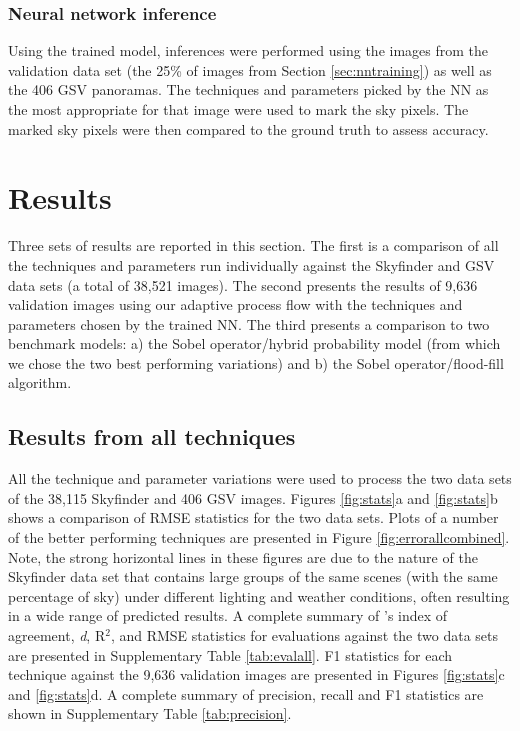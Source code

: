 \documentclass[final,3p,times,authoryear]{elsarticle}
\begin{document}
\subsubsection{Neural network inference}\label{sec:nninference}    
Using the trained model, inferences were performed using the images from the validation data set (the 25\% of images from Section \ref{sec:nntraining}) as well as the 406 GSV panoramas. The techniques and parameters picked by the NN as the most appropriate for that image were used to mark the sky pixels. The marked sky pixels were then compared to the ground truth to assess accuracy.



\section{Results}\label{sec:results}


Three sets of results are reported in this section. The first is a comparison of all the techniques and parameters run individually against the Skyfinder and GSV data sets (a total of 38,521 images). The second presents the results of 9,636 validation images using our adaptive process flow with the techniques and parameters chosen by the trained NN. The third presents a comparison to two benchmark models: a) the \cite{Wang2015a} Sobel operator/hybrid probability model (from which we chose the two best performing variations) and b) the \cite{Middel2018} Sobel operator/flood-fill algorithm.

\subsection{Results from all techniques}\label{sec:resultsall}
All the technique and parameter variations were used to process the two data sets of the 38,115 Skyfinder and 406 GSV images. Figures \ref{fig:stats}a and \ref{fig:stats}b shows a comparison of RMSE statistics for the two data sets. Plots of a number of the better performing techniques are presented in Figure \ref{fig:errorallcombined}. Note, the strong horizontal lines in these figures are due to the nature of the Skyfinder data set that contains large groups of the same scenes (with the same percentage of sky) under different lighting and weather conditions, often resulting in a wide range of predicted results. A complete summary of \cite{Willmott1981}'s index of agreement, \textit{d}, R$^{2}$, and RMSE statistics for evaluations against the two data sets are presented in Supplementary Table \ref{tab:evalall}. F1 statistics for each technique against the 9,636 validation images are presented in Figures \ref{fig:stats}c and \ref{fig:stats}d. A complete summary of precision, recall and F1 statistics are shown in Supplementary Table \ref{tab:precision}.
\end{document}

